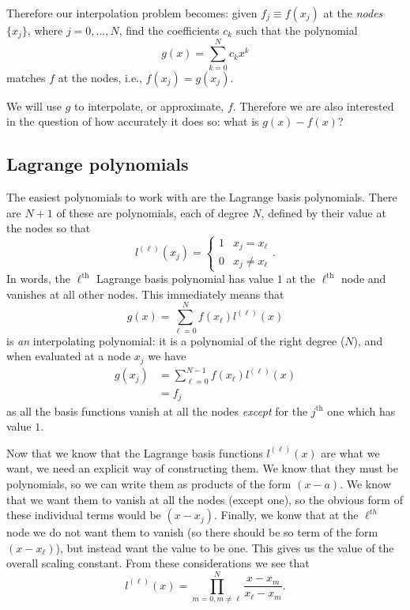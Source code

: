 Therefore our interpolation problem becomes: given $f_j \equiv f(x_j)$ at the \emph{nodes} $\{ x_j \}$, where $j = 0, \dots, N$, find the coefficients $c_k$ such that the polynomial
%
\begin{equation}
  g(x) = \sum_{k=0}^{N} c_k x^k
\end{equation}
%
matches $f$ at the nodes, i.e., $f(x_j) = g(x_j)$.

We will use $g$ to interpolate, or approximate, $f$. Therefore we are also interested in the question of how accurately it does so: what is $g(x) - f(x)$?

\subsection{Lagrange polynomials}

The easiest polynomials to work with are the Lagrange basis polynomials. There are $N+1$ of these are polynomials, each of degree $N$, defined by their value at the nodes so that
%
\begin{equation}
  l^{(\ell)}(x_j) = \begin{cases} 1 & x_j = x_\ell \\ 0 & x_j \ne x_\ell \end{cases}.
\end{equation}
%
In words, the $\ell^{\text{th}}$ Lagrange basis polynomial has value $1$ at the $\ell^{\text{th}}$ node and vanishes at all other nodes. This immediately means that
%
\begin{equation}
  g(x) = \sum_{\ell=0}^{N} f(x_{\ell}) l^{(\ell)}(x)
\end{equation}
%
is \emph{an} interpolating polynomial: it is a polynomial of the right degree ($N$), and when evaluated at a node $x_j$ we have
%
\begin{align}
  g(x_j) &= \sum_{\ell=0}^{N-1} f(x_{\ell}) l^{(\ell)}(x) \\
  &= f_{j}
\end{align}
%
as all the basis functions vanish at all the nodes \emph{except} for the $j^{\text{th}}$ one which has value $1$.

Now that we know that the Lagrange basis functions $l^{(\ell)}(x)$ are what we want, we need an explicit way of constructing them. We know that they must be polynomials, so we can write them as products of the form $(x - a)$. We know that we want them to vanish at all the nodes (except one), so the obvious form of these individual terms would be $(x - x_j)$. Finally, we konw that at the $\ell^{th}$ node we do not want them to vanish (so there should be so term of the form $(x - x_\ell)$), but instead want the value to be one. This gives us the value of the overall scaling constant. From these considerations we see that
%
\begin{equation}
  l^{(\ell)}(x) = \prod_{m=0, m \ne \ell}^{N} \frac{x - x_m}{x_{\ell} - x_m}.
\end{equation}

